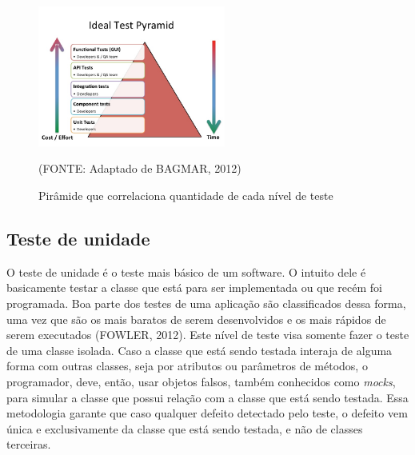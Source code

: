 \documentclass[
    12pt,       %
    openright,      %
    twoside,      %
    a4paper,      %
    english,      %
    french,       %
    spanish,      %
    brazil,       %
    ]{abntex2}
\begin{document}
          \begin{figure}[!htb]
              \begin{center}
                  \includegraphics[width=0.55\textwidth]{img/pyramid.jpg}
              \end{center}
              \caption{\label{fig:passaro}Pirâmide que correlaciona quantidade de cada nível de teste}
              \begin{center}(FONTE: Adaptado de BAGMAR, 2012)\end{center}
          \end{figure}

          \subsection{Teste de unidade}
              O teste de unidade é o teste mais básico de um software. O intuito dele é basicamente
              testar a classe que está para ser implementada ou que recém foi programada. Boa
              parte dos testes de uma aplicação são classificados dessa forma, uma vez que são
              os mais baratos de serem desenvolvidos e os mais rápidos de serem executados (FOWLER, 2012).
              Este nível de teste visa somente fazer o teste de uma classe isolada. Caso a classe
              que está sendo testada interaja de alguma forma com outras classes, seja por atributos
              ou parâmetros de métodos, o programador, deve, então, usar objetos falsos, também
              conhecidos como \textit{mocks}, para simular a classe que possui relação com a classe
              que está sendo testada. Essa metodologia garante que caso qualquer defeito detectado
              pelo teste, o defeito vem única e exclusivamente da classe que está sendo testada,
              e não de classes terceiras.
\end{document}
